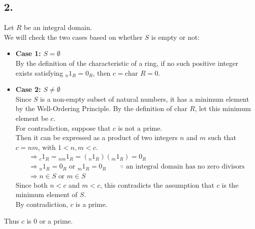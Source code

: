 \documentclass[11pt, a4paper]{article}
\begin{document}
\subsection*{2.}
Let $R$ be an integral domain.\\
We will check the two cases based on whether $S$ is empty or not:
\begin{itemize}
    \item[--] \textbf{Case 1: $S = \emptyset$}\\
    By the definition of the characteristic of a ring, if no such positive integer exists satisfying ${}_n 1_R = 0_R$, then $c = \text{char } R = 0$.

    \item[--] \textbf{Case 2: $S \neq \emptyset$}\\
    Since $S$ is a non-empty subset of natural numbers, it has a minimum element by the Well-Ordering Principle.
    By the definition of $\text{char } R$, let this minimum element be $c$.\\[10pt]
    For contradiction, suppose that $c$ is not a prime.\\
    Then it can be expressed as a product of two integers $n$ and $m$ such that $c = nm$, with $1 < n, m < c$.
    \begin{align*}
        &\Rightarrow {}_c 1_R = {}_{nm} 1_R = ({}_n 1_R)({}_m 1_R) = 0_R \\
        &\Rightarrow {}_n 1_R = 0_R \text{ or } {}_m 1_R = 0_R \qquad \because \text{ an integral domain has no zero divisors}\\
        &\Rightarrow n \in S \text{ or } m \in S
    \end{align*}
    Since both $n < c$ and $m < c$, this contradicts the assumption that $c$ is the minimum element of $S$.\\
    By contradiction, $c$ is a prime.
\end{itemize}
Thus $c$ is $0$ or a prime.
\end{document}
